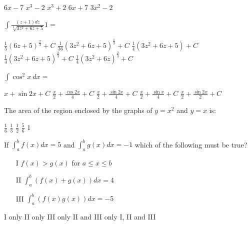 \begin{questions}
    \begin{oneparchoices}
    \choice $6x - 7$
    \CorrectChoice $x^3 - 2$
    \choice $x^3 + 2$
    \choice $6x + 7$
    \choice $3x^2 - 2$
    \end{oneparchoices}

\question[2] $\int \frac{(z+1)dz}{\sqrt[3]{3z^2 + 6z + 5}}1 = $

    \begin{oneparchoices}
    \choice $\frac{1}{5}(6z + 5)^{\frac{2}{3}} + C$
    \choice $\frac{1}{36}(3z^2 + 6z + 5)^{\frac{1}{3}} + C$
    \choice $\frac{1}{4}(3z^2 + 6z + 5) + C$
    \CorrectChoice $\frac{1}{4}(3z^2 + 6z + 5)^{\frac{2}{3}} + C$
    \choice $\frac{1}{4}(3z^2 + 6z)^{\frac{2}{3}} + C$
    \end{oneparchoices}

\question[2] $\int \cos^2 x\ dx = $

    \begin{oneparchoices}
    \choice $x + \sin 2x + C$
    \choice $\frac{x}{2} + \frac{\cos 2x}{4} + C$
    \CorrectChoice $\frac{x}{2} + \frac{\sin 2x}{4} + C$
    \choice $\frac{x}{2} + \frac{\sin x}{4} + C$
    \choice  $\frac{x}{2} + \frac{\sin 2x}{2} + C$
    \end{oneparchoices}

\question[2] The area of the region enclosed by the graphs of $y = x^2$
    and $y = x$ is:

    \begin{oneparchoices}
    \CorrectChoice $\frac{1}{6}$
    \choice $\frac{1}{3}$
    \choice $\frac{1}{2}$
    \choice $\frac{5}{6}$
    \choice $1$
    \end{oneparchoices}

\question[2] If $\int_a^b f(x)dx = 5$ and $\int_a^b g(x)dx = -1$ which
    of the following must be true?
    \begin{enumerate}
    \item[I]   $f(x) > g(x)$ for $a \le x \le b$
    \item[II]  $\int_a^b (f(x) + g(x))dx = 4$
    \item[III] $\int_a^b (f(x)g(x))dx = -5$
    \end{enumerate}

    \begin{oneparchoices}
    \choice I only
    \CorrectChoice II only
    \choice III only
    \choice II and III only
    \choice I, II and III
    \end{oneparchoices}


\end{questions}
